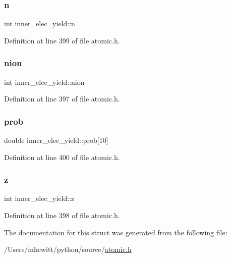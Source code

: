 \mbox{\label{structinner__elec__yield_aabc012a08393c7e3cac5b82314dce446}} 
\subsubsection{\texorpdfstring{n}{n}}
{\footnotesize\ttfamily int inner\+\_\+elec\+\_\+yield\+::n}



Definition at line 399 of file atomic.\+h.

\mbox{\label{structinner__elec__yield_ab2beeab8a3db4cbef0ff6c93a699743b}} 
\subsubsection{\texorpdfstring{nion}{nion}}
{\footnotesize\ttfamily int inner\+\_\+elec\+\_\+yield\+::nion}



Definition at line 397 of file atomic.\+h.

\mbox{\label{structinner__elec__yield_af672262c13778c895c5aa2d0453a843a}} 
\subsubsection{\texorpdfstring{prob}{prob}}
{\footnotesize\ttfamily double inner\+\_\+elec\+\_\+yield\+::prob\mbox{[}10\mbox{]}}



Definition at line 400 of file atomic.\+h.

\mbox{\label{structinner__elec__yield_a0e6a483b5c4f512c7569c1b88b186d59}} 
\subsubsection{\texorpdfstring{z}{z}}
{\footnotesize\ttfamily int inner\+\_\+elec\+\_\+yield\+::z}



Definition at line 398 of file atomic.\+h.



The documentation for this struct was generated from the following file\+:\begin{DoxyCompactItemize}
\item 
/\+Users/mhewitt/python/source/\hyperlink{atomic_8h}{atomic.\+h}\end{DoxyCompactItemize}
